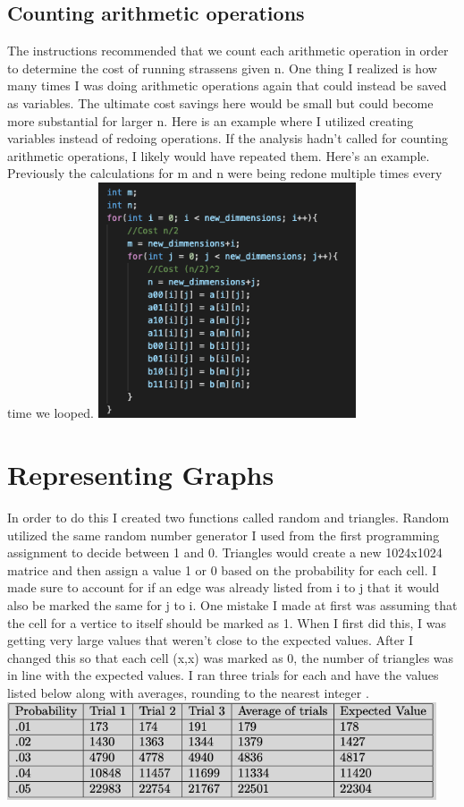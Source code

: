 \documentclass{amsart}
\theoremstyle{definition}
\theoremstyle{remark}
\begin{document}
\subsection{Counting arithmetic operations}
The instructions recommended that we count each arithmetic operation in order to determine the cost of running strassens given n. One thing I realized is how many times I was doing arithmetic operations again that could instead be saved as variables. The ultimate cost savings here would be small but could become more substantial for larger n. Here is an example where I utilized creating variables instead of redoing operations. If the analysis hadn't called for counting arithmetic operations, I likely would have repeated them. Here's an example. Previously the calculations for m and n were being redone multiple times every time we looped.  \break
            \includegraphics[width = 3in]{example.png} 
\newpage
\section{Representing Graphs}
In order to do this I created two functions called random and triangles. Random utilized the same random number generator I used from the first programming assignment to decide between 1 and 0. Triangles would create a new 1024x1024 matrice and then assign a value 1 or 0 based on the probability for each cell. I made sure to account for if an edge was already listed from i to j that it would also be marked the same for j to i. One mistake I made at first was assuming that the cell for a vertice to itself should be marked as 1. When I first did this, I was getting very large values that weren't close to the expected values. After I changed this so that each cell (x,x) was marked as 0, the number of triangles was in line with the expected values. I ran three trials for each and have the values listed below along with averages, rounding to the nearest integer . \break  \break
            \includegraphics[width = 5in]{graphs.png} 


\endflushleft
\end{document}
